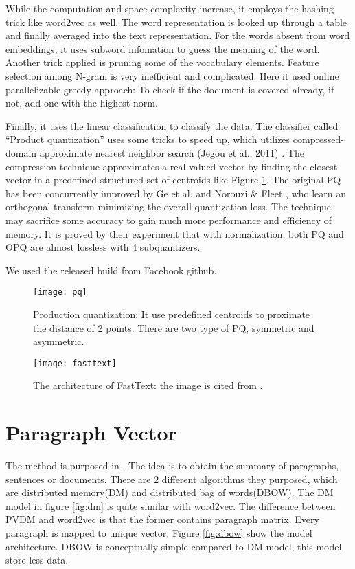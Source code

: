 While the computation and space complexity increase, it employs the hashing trick like word2vec as well. 
The word representation is looked up through a table and finally averaged into the text representation. 
For the words absent from word embeddings, it uses subword infomation\cite{bojanowski2016enriching} to guess the meaning of the word.
Another trick applied is pruning some of the vocabulary elements. Feature selection among N-gram is very inefficient and complicated.
Here it used online parallelizable greedy approach: To check if the document is covered already, if not, add one with the highest norm.

Finally, it uses the linear classification to classify the data. The classifier called \enquote{Product quantization} uses some tricks to speed up, which utilizes compressed-domain approximate nearest neighbor search (Jegou et al., 2011) \cite{jegou2011searching}.
The compression technique approximates a real-valued vector by finding the closest vector in a predefined structured set of centroids like Figure \ref{fig:pq}.
The original PQ has been concurrently improved by Ge et al. \cite{ge2013optimized} and Norouzi \& Fleet , who learn an orthogonal transform minimizing the overall quantization loss.
The technique may sacrifice some accuracy to gain much more performance and efficiency of memory. It is proved by their experiment that with normalization, both PQ and OPQ are almost lossless with 4 subquantizers. 

We used the released build from Facebook github. 

\begin{figure}[h]
    \centering
	\texttt{[image: pq]}
    \caption{Production quantization: It use predefined centroids to proximate the distance of 2 points. There are two type of PQ, symmetric and asymmetric. }
    \label{fig:pq}
\end{figure}

\begin{figure}[h]
    \centering
	\texttt{[image: fasttext]}
    \caption{The architecture of FastText: the image is cited from \cite{joulin2016fasttext}.}
    \label{fig:fasttext}
\end{figure}


\section{Paragraph Vector}
	
The method is purposed in \cite{PVDM}. The idea is to obtain the summary of paragraphs, sentences or documents. 
There are 2 different algorithms they purposed, which are distributed memory(DM) and distributed bag of words(DBOW). 
The DM model in figure \ref{fig:dm} is quite similar with word2vec. The difference between PVDM and word2vec is that the former contains paragraph matrix.
Every paragraph is mapped to unique vector. Figure \ref{fig:dbow} show the model architecture. DBOW is conceptually simple compared to DM model, this model store less data. 

